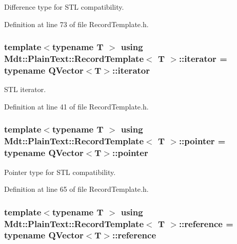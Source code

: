 Difference type for S\+TL compatibility. 



Definition at line 73 of file Record\+Template.\+h.

\subsubsection[{\texorpdfstring{iterator}{iterator}}]{\setlength{\rightskip}{0pt plus 5cm}template$<$typename T $>$ using {\bf Mdt\+::\+Plain\+Text\+::\+Record\+Template}$<$ T $>$\+::{\bf iterator} =  typename Q\+Vector$<$T$>$\+::{\bf iterator}}\hypertarget{class_mdt_1_1_plain_text_1_1_record_template_a0785bfc19bfa479d1097dbfcfdd03bef}{}\label{class_mdt_1_1_plain_text_1_1_record_template_a0785bfc19bfa479d1097dbfcfdd03bef}


S\+TL iterator. 



Definition at line 41 of file Record\+Template.\+h.

\subsubsection[{\texorpdfstring{pointer}{pointer}}]{\setlength{\rightskip}{0pt plus 5cm}template$<$typename T $>$ using {\bf Mdt\+::\+Plain\+Text\+::\+Record\+Template}$<$ T $>$\+::{\bf pointer} =  typename Q\+Vector$<$T$>$\+::{\bf pointer}}\hypertarget{class_mdt_1_1_plain_text_1_1_record_template_ab1e3e7564bfe55912676507a2d09bad4}{}\label{class_mdt_1_1_plain_text_1_1_record_template_ab1e3e7564bfe55912676507a2d09bad4}


Pointer type for S\+TL compatibility. 



Definition at line 65 of file Record\+Template.\+h.

\subsubsection[{\texorpdfstring{reference}{reference}}]{\setlength{\rightskip}{0pt plus 5cm}template$<$typename T $>$ using {\bf Mdt\+::\+Plain\+Text\+::\+Record\+Template}$<$ T $>$\+::{\bf reference} =  typename Q\+Vector$<$T$>$\+::{\bf reference}}\hypertarget{class_mdt_1_1_plain_text_1_1_record_template_ab949b8e6a719f3155a6ff2116e3628ce}{}\label{class_mdt_1_1_plain_text_1_1_record_template_ab949b8e6a719f3155a6ff2116e3628ce}


